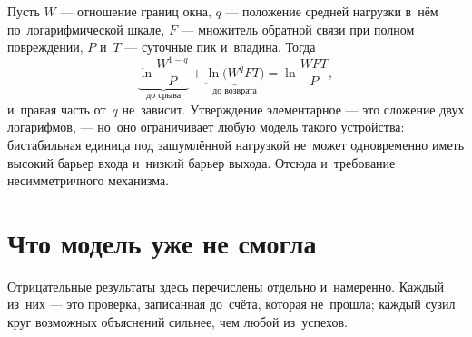\documentclass[11pt,a4paper,landscape,twocolumn]{article}
\begin{document}
\begin{ineq}
Пусть $W$ — отношение границ окна, $q$ — положение средней нагрузки в~нём по~логарифмической шкале, $F$ — множитель обратной связи при полном повреждении, $P$ и~$T$ — суточные пик и~впадина. Тогда
\[\underbrace{\ln\frac{W^{1-q}}{P}}_{\text{до срыва}} + \underbrace{\ln\big(W^{q} F T\big)}_{\text{до возврата}} = \ln\frac{W F T}{P},\]
и~правая часть от~$q$ не~зависит. Утверждение элементарное — это сложение двух логарифмов, — но~оно ограничивает любую модель такого устройства: бистабильная единица под зашумлённой нагрузкой не~может одновременно иметь высокий барьер входа и~низкий барьер выхода. Отсюда и~требование несимметричного механизма.
\end{ineq}

\section{Что модель уже не смогла}\label{sec:fail}
Отрицательные результаты здесь перечислены отдельно и~намеренно. Каждый из~них — это проверка, записанная до~счёта, которая не~прошла; каждый сузил круг возможных объяснений сильнее, чем любой из~успехов.
\end{document}
